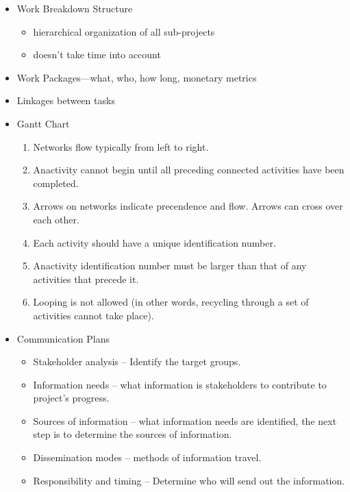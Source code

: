 \documentclass[8pt, letter]{extarticle}
\begin{document}
\begin{multicols}{2}
\begin{itemize}
        \item Work Breakdown Structure
            \begin{itemize}
                \item hierarchical organization of all sub-projects
                \item doesn't take time into account
            \end{itemize}
        \item Work Packages—what, who, how long, monetary metrics
        \item Linkages between tasks
        \item Gantt Chart
            \begin{enumerate}
                \item Networks flow typically from left to right.
                \item Anactivity cannot begin until all preceding connected activities have been completed.
                \item Arrows on networks indicate precendence and flow. Arrows can cross over each other.
                \item Each activity should have a unique identification number.
                \item Anactivity identification number must be larger than that of any activities that precede it.
                \item Looping is not allowed (in other words, recycling through a set of activities cannot take place).
            \end{enumerate}
        \item Communication Plans
            \begin{itemize}
                \item Stakeholder analysis – Identify the target groups. 
                \item Information needs – what information is stakeholders to contribute to project's progress. 
                \item Sources of information – what information needs are identified, the next step is to determine the sources of information. 
                \item Dissemination modes – methods of information travel. 
                \item Responsibility and timing – Determine who will send out the information.
            \end{itemize}
    \end{itemize}


\end{multicols}
\end{document}
